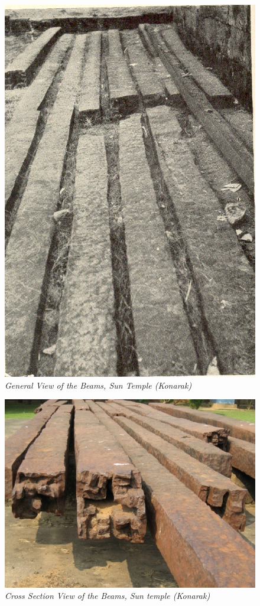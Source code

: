 \begin{figure}[H]
\renewcommand{\thefigure}{29 A}
\includegraphics[scale=1]{images/chapter-5/Fig29A.jpg}
\caption{\textit{General View of the Beams, Sun Temple (Konarak)}}\label{chpater-005-fig29A}
\end{figure}

\begin{figure}[H]
\renewcommand{\thefigure}{29 B}
\includegraphics[scale=1.5]{images/chapter-5/Fig29B.jpg}
\caption{\textit{Cross Section View of the Beams, Sun temple  (Konarak)}}\label{chpater-005-fig29B}
\end{figure}

